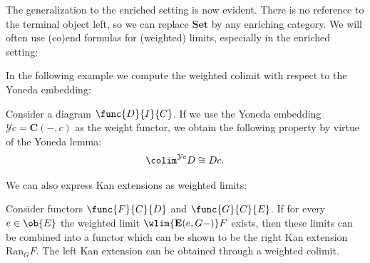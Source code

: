     The generalization to the enriched setting is now evident. There is no reference to the terminal object left, so we can replace $\mathbf{Set}$ by any enriching category. We will often use (co)end formulas for (weighted) limits, especially in the enriched setting:

    In the following example we compute the weighted colimit with respect to the Yoneda embedding:
    \begin{example}
        Consider a diagram $\func{D}{I}{C}$. If we use the Yoneda embedding $\mathcal{Y}c = \mathbf{C}(-, c)$ as the weight functor, we obtain the following property by virtue of the Yoneda lemma:
        \begin{gather}
            \label{cat:weighted_hom_colimit}
            \colim^{\mathcal{Y}c}D\cong Dc.
        \end{gather}
    \end{example}

    We can also express Kan extensions as weighted limits:
    \begin{property}
        Consider functors $\func{F}{C}{D}$ and $\func{G}{C}{E}$. If for every $e\in\ob{E}$ the weighted limit $\wlim{\mathbf{E}(e, G-)}F$ exists, then these limits can be combined into a functor which can be shown to be the right Kan extension $\text{Ran}_GF$. The left Kan extension can be obtained through a weighted colimit.
    \end{property}

